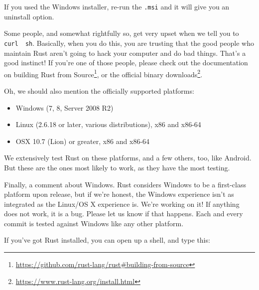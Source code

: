 \documentclass[a4paper,]{book}
\newenvironment{Shaded}{\begin{snugshade}}{\end{snugshade}}
\newcommand{\KeywordTok}[1]{\textcolor[rgb]{0.13,0.29,0.53}{\textbf{{#1}}}}
\newcommand{\NormalTok}[1]{{#1}}
\renewcommand{\href}[2]{#2\footnote{\url{#1}}}
\providecommand{\tightlist}{%
  \setlength{\itemsep}{0pt}\setlength{\parskip}{0pt}}
\begin{document}
\begin{Shaded}
\end{Shaded}

If you used the Windows installer, re-run the \texttt{.msi} and it will
give you an uninstall option.

Some people, and somewhat rightfully so, get very upset when we tell you
to \texttt{curl\ \textbar{}\ sh}. Basically, when you do this, you are
trusting that the good people who maintain Rust aren't going to hack
your computer and do bad things. That's a good instinct! If you're one
of those people, please check out the documentation on
\href{https://github.com/rust-lang/rust\#building-from-source}{building
Rust from Source}, or \href{https://www.rust-lang.org/install.html}{the
official binary downloads}.

Oh, we should also mention the officially supported platforms:

\begin{itemize}
\tightlist
\item
  Windows (7, 8, Server 2008 R2)
\item
  Linux (2.6.18 or later, various distributions), x86 and x86-64
\item
  OSX 10.7 (Lion) or greater, x86 and x86-64
\end{itemize}

We extensively test Rust on these platforms, and a few others, too, like
Android. But these are the ones most likely to work, as they have the
most testing.

Finally, a comment about Windows. Rust considers Windows to be a
first-class platform upon release, but if we're honest, the Windows
experience isn't as integrated as the Linux/OS X experience is. We're
working on it! If anything does not work, it is a bug. Please let us
know if that happens. Each and every commit is tested against Windows
like any other platform.

If you've got Rust installed, you can open up a shell, and type this:

\begin{Shaded}
\end{Shaded}
\end{document}
